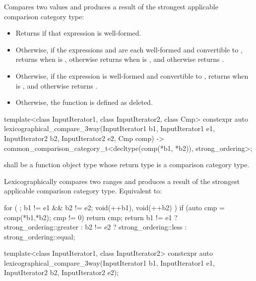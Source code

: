 \begin{itemdescr}
\pnum
\effects
Compares two values and produces a result of the strongest applicable
comparison category type:
\begin{itemize}
\item
Returns  if that expression is well-formed.
\item
Otherwise, if the expressions  and 
are each well-formed and convertible to ,
returns 
when  is ,
otherwise returns 
when  is ,
and otherwise returns .
\item
Otherwise, if the expression 
is well-formed and convertible to ,
returns 
when  is ,
and otherwise returns .
\item
Otherwise, the function is defined as deleted.
\end{itemize}
\end{itemdescr}

%
\begin{itemdecl}
template<class InputIterator1, class InputIterator2, class Cmp>
  constexpr auto
    lexicographical_compare_3way(InputIterator1 b1, InputIterator1 e1,
                                 InputIterator2 b2, InputIterator2 e2,
                                 Cmp comp)
      -> common_comparison_category_t<decltype(comp(*b1, *b2)), strong_ordering>;
\end{itemdecl}

\begin{itemdescr}
\pnum
\requires
{} shall be a function object type
whose return type is a comparison category type.

\pnum
\effects
Lexicographically compares two ranges and
produces a result of the strongest applicable
comparison category type.
Equivalent to:
\begin{codeblock}
for ( ; b1 != e1 && b2 != e2; void(++b1), void(++b2) )
  if (auto cmp = comp(*b1,*b2); cmp != 0)
    return cmp;
return b1 != e1 ? strong_ordering::greater :
       b2 != e2 ? strong_ordering::less :
                  strong_ordering::equal;
\end{codeblock}
\end{itemdescr}

%
\begin{itemdecl}
template<class InputIterator1, class InputIterator2>
  constexpr auto
    lexicographical_compare_3way(InputIterator1 b1, InputIterator1 e1,
                                 InputIterator2 b2, InputIterator2 e2);
\end{itemdecl}

